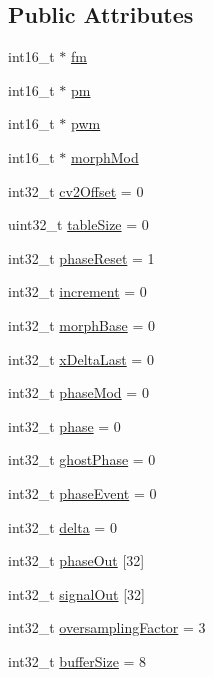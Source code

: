 \subsection*{Public Attributes}
\begin{DoxyCompactItemize}
\item 
int16\+\_\+t $\ast$ \mbox{\hyperlink{class_sync_wavetable_a21e7f298cf33f8fe07bb5dc0818b977d}{fm}}
\item 
int16\+\_\+t $\ast$ \mbox{\hyperlink{class_sync_wavetable_ad3ee95c19a168234f4e72c57f1c31cbe}{pm}}
\item 
int16\+\_\+t $\ast$ \mbox{\hyperlink{class_sync_wavetable_a7a7fed16ef7013e5543616df1c4343a4}{pwm}}
\item 
int16\+\_\+t $\ast$ \mbox{\hyperlink{class_sync_wavetable_a8738a9aff9fc0e6a4baf0636335c38b0}{morph\+Mod}}
\item 
int32\+\_\+t \mbox{\hyperlink{class_sync_wavetable_a278f6a28de273fb87b01d9427f215978}{cv2\+Offset}} = 0
\item 
uint32\+\_\+t \mbox{\hyperlink{class_sync_wavetable_aabb4534f741acf29d9b8e2e020a357b1}{table\+Size}} = 0
\item 
int32\+\_\+t \mbox{\hyperlink{class_sync_wavetable_a6be981813fd8f266eab3ac81c1ce198f}{phase\+Reset}} = 1
\item 
int32\+\_\+t \mbox{\hyperlink{class_sync_wavetable_ae7d01c7216418a9b386387c7fdb95a0b}{increment}} = 0
\item 
int32\+\_\+t \mbox{\hyperlink{class_sync_wavetable_a4f5fe1848746a23c7267011543bcf2ba}{morph\+Base}} = 0
\item 
int32\+\_\+t \mbox{\hyperlink{class_sync_wavetable_af518f49664b075b32e1d415ee9f890e5}{x\+Delta\+Last}} = 0
\item 
int32\+\_\+t \mbox{\hyperlink{class_sync_wavetable_ae6d17a9e1d3262dc177cbfe5fee172f9}{phase\+Mod}} = 0
\item 
int32\+\_\+t \mbox{\hyperlink{class_sync_wavetable_a0a40712c5f0fef1db3eb8aed79c04110}{phase}} = 0
\item 
int32\+\_\+t \mbox{\hyperlink{class_sync_wavetable_a7e8fdf9242c878cc743e7f48588616df}{ghost\+Phase}} = 0
\item 
int32\+\_\+t \mbox{\hyperlink{class_sync_wavetable_a50f7f350402ffef407bdfc534a57b4d6}{phase\+Event}} = 0
\item 
int32\+\_\+t \mbox{\hyperlink{class_sync_wavetable_a0a67b9bb161d1ec283d179f80a7bc62a}{delta}} = 0
\item 
int32\+\_\+t \mbox{\hyperlink{class_sync_wavetable_a310d23af550451b78218ccb5c1b4c661}{phase\+Out}} \mbox{[}32\mbox{]}
\item 
int32\+\_\+t \mbox{\hyperlink{class_sync_wavetable_a8e641290c730b3c2600585a3907df688}{signal\+Out}} \mbox{[}32\mbox{]}
\item 
int32\+\_\+t \mbox{\hyperlink{class_sync_wavetable_a60de2d912921df9d932ae43fa40bd3d8}{oversampling\+Factor}} = 3
\item 
int32\+\_\+t \mbox{\hyperlink{class_sync_wavetable_acfd92e1f0f4e7176b754309a7ce3e14e}{buffer\+Size}} = 8
\end{DoxyCompactItemize}
